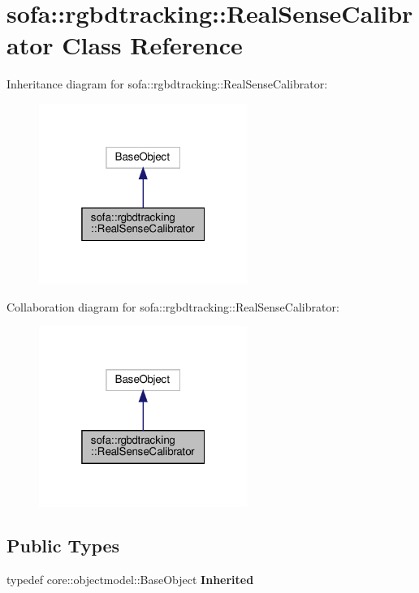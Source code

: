 \hypertarget{classsofa_1_1rgbdtracking_1_1_real_sense_calibrator}{}\section{sofa\+:\+:rgbdtracking\+:\+:Real\+Sense\+Calibrator Class Reference}
\label{classsofa_1_1rgbdtracking_1_1_real_sense_calibrator}


Inheritance diagram for sofa\+:\+:rgbdtracking\+:\+:Real\+Sense\+Calibrator\+:
\nopagebreak
\begin{figure}[H]
\begin{center}
\leavevmode
\includegraphics[width=193pt]{classsofa_1_1rgbdtracking_1_1_real_sense_calibrator__inherit__graph}
\end{center}
\end{figure}


Collaboration diagram for sofa\+:\+:rgbdtracking\+:\+:Real\+Sense\+Calibrator\+:
\nopagebreak
\begin{figure}[H]
\begin{center}
\leavevmode
\includegraphics[width=193pt]{classsofa_1_1rgbdtracking_1_1_real_sense_calibrator__coll__graph}
\end{center}
\end{figure}
\subsection*{Public Types}
\begin{DoxyCompactItemize}
\item 
\mbox{\label{classsofa_1_1rgbdtracking_1_1_real_sense_calibrator_af5eef0eeea5daa52e920b9d29e5575dc}} 
typedef core\+::objectmodel\+::\+Base\+Object {\bfseries Inherited}
\end{DoxyCompactItemize}
